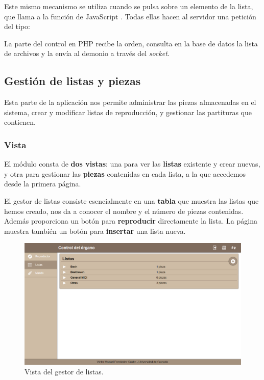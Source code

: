 Este mismo mecanismo se utiliza cuando se pulsa sobre un elemento de la lista, que llama a la función de JavaScript . Todas ellas hacen al servidor una petición del tipo: 

\begin{center}
\end{center}

La parte del control en PHP recibe la orden, consulta en la base de datos la lista de archivos y la envía al demonio a través del \textit{socket}.

\subsection{Gestión de listas y piezas}
\label{subsec:impl_gestor}

Esta parte de la aplicación nos permite administrar las piezas almacenadas en el sistema, crear y modificar listas de reproducción, y gestionar las partituras que contienen.

\subsubsection{Vista}

El módulo consta de \textbf{dos vistas}: una para ver las \textbf{listas} existente y crear nuevas, y otra para gestionar las \textbf{piezas} contenidas en cada lista, a la que accedemos desde la primera página.

El gestor de listas consiste esencialmente en una \textbf{tabla} que muestra las listas que hemos creado, nos da a conocer el nombre y el número de piezas contenidas. Además proporciona un botón para \textbf{reproducir} directamente la lista. La página muestra también un botón para \textbf{insertar} una lista nueva.

\smallskip

\begin{figure}[H]
	\noindent \begin{centering}
		\includegraphics[width=\linewidth*2/3]{capitulo5/cap_listas}
		\par\end{centering}
	\smallskip
	\caption{\label{fig:cap_listas} Vista del gestor de listas.}
\end{figure} 

